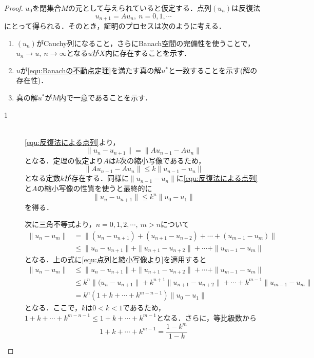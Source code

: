 \documentclass[11pt,a4paper,titlepage]{jsreport}
\theoremstyle{definition}
\begin{document}
\begin{proof}
  $u_0$を閉集合$M$の元として与えられていると仮定する．点列$(u_n)$は反復法
  \begin{equation}
    \label{equ:反復法による点列}
    u_{n+1}=Au_n,\ n=0,1,\cdots
  \end{equation}
  にとって得られる．そのとき，証明のプロセスは次のように考える．
  \begin{enumerate}
    \item $(u_n)$がCauchy列になること，さらにBanach空間の完備性を使うことで，$u_n\rightarrow u,\ n\rightarrow \infty$となる$u$が$X$内に存在することを示す．
    \item $u$が\eqref{equ:Banachの不動点定理}を満たす真の解$u^*$と一致することを示す(解の存在性)．
    \item 真の解$u^*$が$M$内で一意であることを示す．
  \end{enumerate}

  \begin{description}
    \item[1]
      \quad\\
      \eqref{equ:反復法による点列}より，
      \begin{equation}
        \|u_n-u_{n+1}\|=\|Au_{n-1}-Au_{n}\|
      \end{equation}
      となる．定理の仮定より$A$は$k$次の縮小写像であるため，
      \begin{equation}
        \|Au_{n-1}-Au_{n}\|\leq k\|u_{n-1}-u_{n}\|
      \end{equation}
      となる定数$k$が存在する．同様に$\|u_{n-1}-u_{n}\|$に\eqref{equ:反復法による点列}と$A$の縮小写像の性質を使うと最終的に
      \begin{equation}
        \label{equ:点列と縮小写像より}
        \|u_{n}-u_{n+1}\|\leq k^n\|u_{0}-u_{1}\|
      \end{equation}
      を得る．

      次に三角不等式より，$n=0,1,2,\cdots,\ m>n$について
      \begin{align}
        \|u_{n}-u_{m}\| & = \|(u_{n}-u_{n+1})+(u_{n+1}-u_{n+2})+\cdots+(u_{m-1}-u_{m})\|      \\
                        & \leq \|u_{n}-u_{n+1}\|+\|u_{n+1}-u_{n+2}\|+\cdots+\|u_{m-1}-u_{m}\|
      \end{align}
      となる．上の式に\eqref{equ:点列と縮小写像より}を適用すると
      \begin{align}
        \|u_{n}-u_{m}\| & \leq \|u_{n}-u_{n+1}\|+\|u_{n+1}-u_{n+2}\|+\cdots+\|u_{m-1}-u_{m}\| \label{equ:-1}    \\
                        & \leq k^n\|(u_{n}-u_{n+1}\|+k^{n+1}\|u_{n+1}-u_{n+2}\|+\cdots+k^{m-1}\|u_{m-1}-u_{m}\| \\
                        & = k^n(1+k+\cdots+k^{m-n-1})\|u_0-u_1\|
      \end{align}
      となる．ここで，$k$は$0<k<1$であるため，$1+k+\cdots+k^{m-n-1}\leq 1+k+\cdots+k^{m-1}$となる．さらに，等比級数から
      \begin{equation}
        1+k+\cdots+k^{m-1} = \frac{1-k^m}{1-k}
      \end{equation}


\end{description}
\end{proof}
\end{document}
